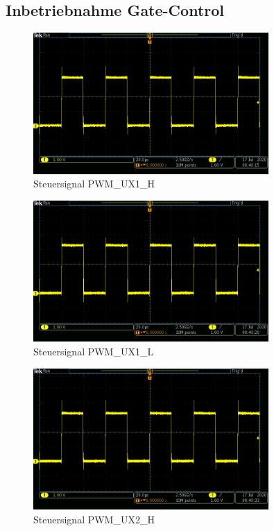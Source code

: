 \begin{appendix}
\subsection{Inbetriebnahme Gate-Control}

\begin{figure}[h!]
\center
\includegraphics[width = 0.8\textwidth]{graphics/PWM_UX1_H}
\caption{Steuersignal PWM\_UX1\_H}
\label{fig:PWM_UX1_H}
\end{figure}

\begin{figure}[h!]
\center
\includegraphics[width = 0.8\textwidth]{graphics/PWM_UX1_L}
\caption{Steuersignal PWM\_UX1\_L}
\label{fig:PWM_UX1_L}
\end{figure}

\newpage

\begin{figure}[h!]
\center
\includegraphics[width = 0.8\textwidth]{graphics/PWM_UX2_H}
\caption{Steuersignal PWM\_UX2\_H}
\label{fig:PWM_UX2_H}
\end{figure}


\end{appendix}
